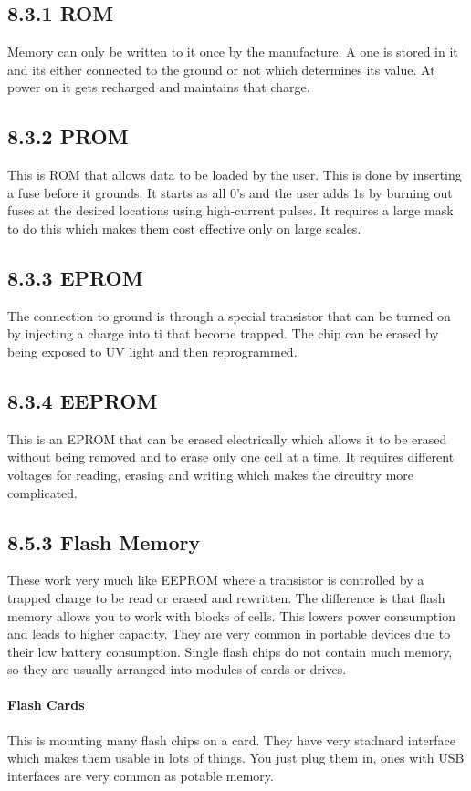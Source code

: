 \documentclass[12pt]{article}
\begin{document}
\subsection*{8.3.1 ROM}
Memory can only be written to it once by the manufacture. A one is stored in it and its either connected to the ground or not which determines its value. At power on it gets recharged and maintains that charge.
\subsection*{8.3.2 PROM}
This is ROM that allows data to be loaded by the user. This is done by inserting a fuse before it grounds. It starts as all 0's and the user adds 1s by burning out fuses at the desired locations using high-current pulses. It requires a large mask to do this which makes them cost effective only on large scales.
\subsection*{8.3.3 EPROM}
The connection to ground is through a special transistor that can be turned on by injecting a charge into ti that become trapped. The chip can be erased by being exposed to UV light and then reprogrammed.
\subsection*{8.3.4 EEPROM}
This is an EPROM that can be erased electrically which allows it to be erased without being removed and to erase only one cell at a time. It requires different voltages for reading, erasing and writing which makes the circuitry more complicated. 
\subsection{8.5.3 Flash Memory}
These work very much like EEPROM where a transistor is controlled by a trapped charge to be read or erased and rewritten. The difference is that flash memory allows you to work with blocks of cells. This lowers power consumption and leads to higher capacity. They are very common in portable devices due to their low battery consumption. Single flash chips do not contain much memory, so they are usually arranged into modules of cards or drives.
\paragraph*{Flash Cards}
This is mounting many flash chips on a card. They have very stadnard interface which makes them usable in lots of things. You just plug them in, ones with USB interfaces are very common as potable memory. 
\end{document}
